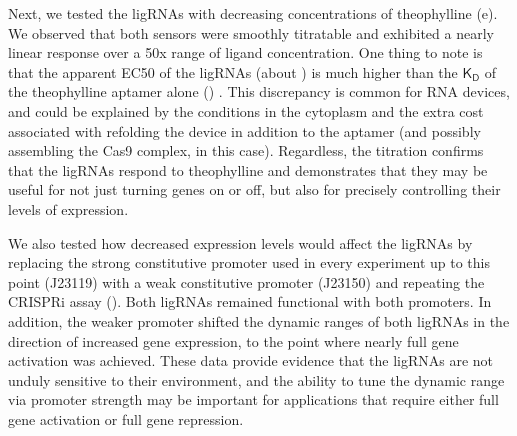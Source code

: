 \documentclass[10pt,oneside]{article}
\begin{document}


Next, we tested the ligRNAs with decreasing concentrations of theophylline (e).  We observed that both sensors were smoothly titratable and exhibited a nearly linear response over a 50x range of ligand concentration.  One thing to note is that the apparent EC50 of the ligRNAs (about ) is much higher than the $\mathsf{K_D}$ of the theophylline aptamer alone () \autocite{jenison1994}.  This discrepancy is common for RNA devices, and could be explained by the conditions in the cytoplasm \autocite{carothers2010} and the extra cost associated with refolding the device in addition to the aptamer (and possibly assembling the Cas9 complex, in this case).  Regardless, the titration confirms that the ligRNAs respond to theophylline and demonstrates that they may be useful for not just turning genes on or off, but also for precisely controlling their levels of expression.


We also tested how decreased expression levels would affect the ligRNAs by replacing the strong constitutive promoter used in every experiment up to this point (J23119) with a weak constitutive promoter (J23150) and repeating the CRISPRi assay ().  Both ligRNAs remained functional with both promoters.  In addition, the weaker promoter shifted the dynamic ranges of both ligRNAs in the direction of increased gene expression, to the point where nearly full gene activation was achieved.  These data provide evidence that the ligRNAs are not unduly sensitive to their environment, and the ability to tune the dynamic range via promoter strength may be important for applications that require either full gene activation or full gene repression.


\end{document}

